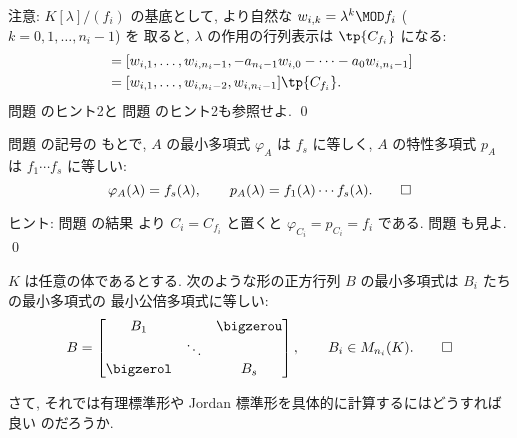 \documentclass[12pt,twoside]{jarticle}
\begin{document}
\medskip
\noindent
注意: $K[\lambda]/(f_i)$ の基底として, 
より自然な $w_{i,k}=\lambda^k\MOD f_i$ ($k=0,1,\dots,n_i-1$) を
取ると, $\lambda$ の作用の行列表示は $\tp{C_{f_i}}$ になる:
\begin{align*}
  [\lambda w_{i,0},\dots,\lambda w_{i,n_i-2},\lambda w_{i,n_i-1}]
  &
  = [w_{i,1},\dots,w_{i,n_i-1},
     -a_{n_i-1}w_{i,0}-\cdots-a_0w_{i,n_i-1}]
  \\ &
  = [w_{i,1},\dots,w_{i,n_i-2},w_{i,n_i-1}]\tp{C_{f_i}}.
\end{align*}
問題  のヒント2と
問題  のヒント2も参照せよ.
\qed


\begin{question}
  問題  の記号の
  もとで,  $A$ の最小多項式 $\varphi_A$ は $f_s$ に等しく,
  $A$ の特性多項式 $p_A$ は $f_1\cdots f_s$ に等しい:
  \begin{equation*}
    \varphi_A(\lambda) = f_s(\lambda),
    \qquad
    p_A(\lambda) = f_1(\lambda)\cdots f_s(\lambda).
    \qed
  \end{equation*}
\end{question}

\noindent
ヒント: 問題  の結果
より $C_i=C_{f_i}$ と置くと $\varphi_{C_i}=p_{C_i}=f_i$ である.
問題  も見よ.
\qed


\begin{question}
\label{q:varphi_B}
  $K$ は任意の体であるとする.
  次のような形の正方行列 $B$ の最小多項式は $B_i$ たちの最小多項式の
  最小公倍多項式に等しい:
  \begin{equation*}
    B = 
    \begin{bmatrix}
      B_1 &        & \bigzerou \\
          & \ddots & \\
      \bigzerol &  & B_s \\
    \end{bmatrix},
    \qquad
    B_i\in M_{n_i}(K).
    \qed
  \end{equation*}
\end{question}

\bigskip

さて, それでは有理標準形や Jordan 標準形を具体的に計算するにはどうすれば良い
のだろうか.
\end{document}
